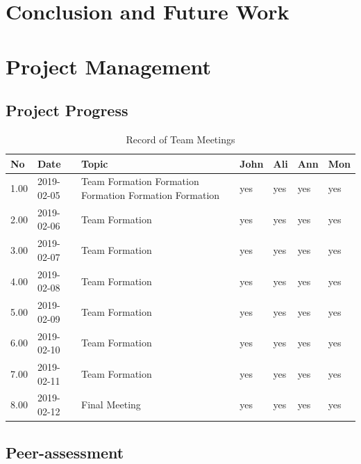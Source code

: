 \documentclass[10pt]{article}\usepackage[]{graphicx}\usepackage[]{color}
\begin{document}
\section{Conclusion and Future Work}\label{cdsmote1}






\section{Project Management}\label{mgt}

\subsection{Project Progress}
\begin{table}[ht]
\centering
\caption{Record of Team Meetings} 
\label{tab:one}
\begin{tabular}{llp{8cm}llll}
  \hline
No & Date & Topic & John & Ali & Ann & Mon \\ 
  \hline
1.00 & 2019-02-05 & Team Formation Formation Formation Formation Formation  & yes & yes & yes & yes \\ 
  2.00 & 2019-02-06 & Team Formation & yes & yes & yes & yes \\ 
  3.00 & 2019-02-07 & Team Formation & yes & yes & yes & yes \\ 
  4.00 & 2019-02-08 & Team Formation & yes & yes & yes & yes \\ 
  5.00 & 2019-02-09 & Team Formation & yes & yes & yes & yes \\ 
  6.00 & 2019-02-10 & Team Formation & yes & yes & yes & yes \\ 
  7.00 & 2019-02-11 & Team Formation & yes & yes & yes & yes \\ 
  8.00 & 2019-02-12 & Final Meeting & yes & yes & yes & yes \\ 
   \hline
\end{tabular}
\end{table}





\subsection{Peer-assessment}
\end{document}
